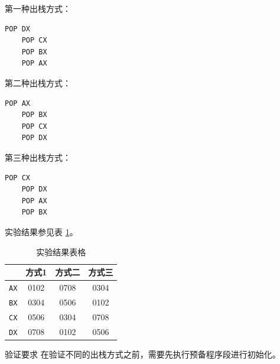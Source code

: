 \documentclass[11pt]{SEU-Digital-Report}
\newcommand{\grayrow}{\rowcolor[rgb]{ .906, .902, .902}}
\begin{document}
第一种出栈方式：
\begin{lstlisting}[language={[x86masm]Assembler},title=way1]
    POP DX
    POP CX
    POP BX
    POP AX
\end{lstlisting}

第二种出栈方式：
\begin{lstlisting}[language={[x86masm]Assembler},title=way2]
    POP AX
    POP BX
    POP CX
    POP DX
\end{lstlisting}

第三种出栈方式：
\begin{lstlisting}[language={[x86masm]Assembler},title=way3]
    POP CX
    POP DX
    POP AX
    POP BX
\end{lstlisting}

实验结果参见表 \ref{tab:rlt2}。
\begin{table}[htbp]
    \centering
    \caption{实验结果表格 \label{tab:rlt2}}
    \bgroup{}
    \setlength{\tabcolsep}{5mm}
        \begin{tabular}{c|c|c|c}
          \toprule
            & \textbf{方式1} & \textbf{方式二} & \textbf{方式三}\\
            \midrule\midrule
            \grayrow \texttt{AX} & 0102 & 0708 & 0304 \\
            \texttt{BX} & 0304 & 0506 & 0102 \\
            \grayrow \texttt{CX} & 0506 & 0304 & 0708 \\
            \texttt{DX} & 0708 & 0102 & 0506 \\
          \bottomrule
        \end{tabular}
    \egroup
\end{table}

\begin{note}{验证要求}{}
    在验证不同的出栈方式之前，需要先执行预备程序段进行初始化。
\end{note}
\end{document}
